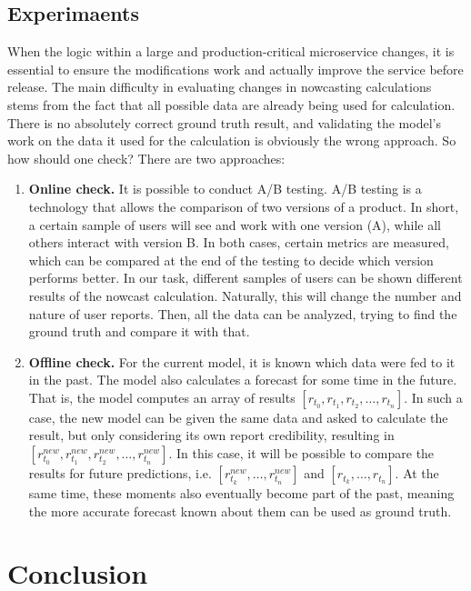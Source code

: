 \documentclass[conference]{IEEEtran}
\begin{document}
\subsection{Experimaents}

When the logic within a large and production-critical microservice changes, it is essential to ensure the modifications work and actually improve the service before release. The main difficulty in evaluating changes in nowcasting calculations stems from the fact that all possible data are already being used for calculation. There is no absolutely correct ground truth result, and validating the model's work on the data it used for the calculation is obviously the wrong approach. So how should one check? There are two approaches:
\begin{enumerate}
	\item \textbf{Online check.} It is possible to conduct A/B testing. A/B testing is a technology that allows the comparison of two versions of a product. In short, a certain sample of users will see and work with one version (A), while all others interact with version B. In both cases, certain metrics are measured, which can be compared at the end of the testing to decide which version performs better. In our task, different samples of users can be shown different results of the nowcast calculation. Naturally, this will change the number and nature of user reports. Then, all the data can be analyzed, trying to find the ground truth and compare it with that.
	\item \textbf{Offline check.} For the current model, it is known which data were fed to it in the past. The model also calculates a forecast for some time in the future. That is, the model computes an array of results $[r_{t_0}, r_{t_1}, r_{t_2}, \dots, r_{t_n}]$. In such a case, the new model can be given the same data and asked to calculate the result, but only considering its own report credibility, resulting in $[r^{new}_{t_0}, r^{new}_{t_1}, r^{new}_{t_2}, \dots, r^{new}_{t_n}]$. In this case, it will be possible to compare the results for future predictions, i.e. $[r^{new}_{t_k}, \dots, r^{new}_{t_n}]$ and $[r_{t_k}, \dots, r_{t_n}]$. At the same time, these moments also eventually become part of the past, meaning the more accurate forecast known about them can be used as ground truth.
\end{enumerate}

\section{Conclusion}
\end{document}
